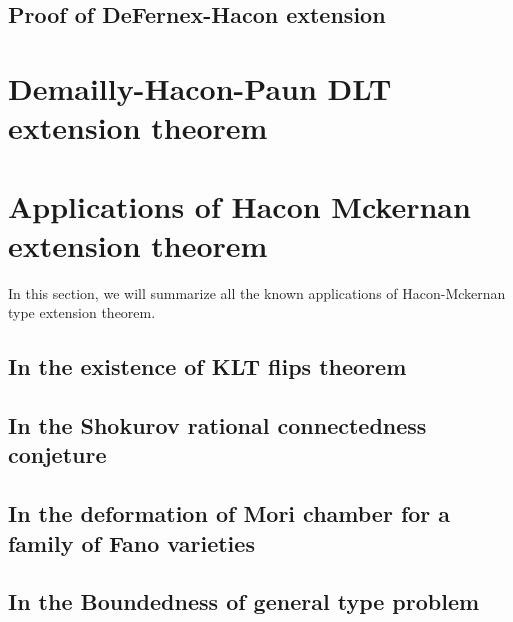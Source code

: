 \documentclass[11pt]{article}
\theoremstyle{definition}
\begin{document}
	\subsection{Proof of DeFernex-Hacon extension}
	
	
	\section{Demailly-Hacon-Paun DLT extension theorem}
	
	
	
	\section{Applications of Hacon Mckernan extension theorem}
	In this section, we will summarize all the known applications of Hacon-Mckernan type extension theorem.
	
	\subsection{In the existence of KLT flips theorem}
	
	\subsection{In the Shokurov rational connectedness conjeture}
	
	\subsection{In the deformation of Mori chamber for a family of Fano varieties}
	
	\subsection{In the Boundedness of general type problem}
	
	
	
\end{document}

